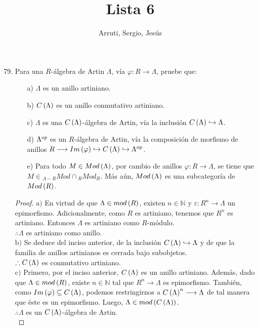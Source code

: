 \documentclass{article}
\title{Lista 6}
\author{Arruti, Sergio, Jesús}
\date{}
\begin{document}
	\maketitle
	\begin{enumerate}[label=\textbf{Ej \arabic*.}]
		\setcounter{enumi}{78}
		\item Para una $R$-álgebra de Artin $\Lambda$, vía $\varphi : R \longrightarrow \Lambda$, pruebe que:
		\begin{itemize}
			\item[a)] $\Lambda$ es un anillo artiniano.
			\item[b)] $C\left(\Lambda\right)$ es un anillo conmutativo artiniano.
			\item[c)] $\Lambda$ es una $C\left(\Lambda\right)$-álgebra de Artin, vía la inclusión $C\left(\Lambda\right)\hookrightarrow\Lambda$.
			\item[d)] ${\Lambda}^{op}$ es un $R$-álgebra de Artin, vía la composición de morfismo de anillos $R \longrightarrow Im\left(\varphi\right)\hookrightarrow C\left(\Lambda\right)\hookrightarrow{\Lambda}^{op}$.
			\item[e)] Para todo $M \in Mod\left(\Lambda\right)$, por cambio de anillos $\varphi : R \longrightarrow \Lambda$, se tiene que $M \in {}_{\Lambda - R}Mod \cap {}_{R}Mod_{R}$. Más aún, $Mod\left(\Lambda\right)$ es una subcategoría de $Mod\left(R\right)$.
		\end{itemize}
		\begin{proof}
			$\boxed{\text{a)}}$ En virtud de que $\Lambda \in mod\left(R\right)$, existen $n\in\mathbb{N}$ y $\varepsilon:R^{n}\longrightarrow\Lambda$ un epimorfismo. Adicionalmente, como $R$ es artiniano, tenemos que $R^{n}$ es artiniano. Entonces $\Lambda$ es artiniano como $R$-módulo.\\
			$\therefore\Lambda$ es artiniano como anillo.\\
			
			$\boxed{\text{b)}}$ Se deduce del inciso anterior, de la inclusión $C\left(\Lambda\right)\hookrightarrow\Lambda$ y de que la familia de anillos artinianos es cerrada bajo subobjetos.\\
			$\therefore C\left(\Lambda\right)$ es conmutativo artiniano.\\
			
			$\boxed{\text{c)}}$ Primero, por el inciso anterior, $C\left(\Lambda\right)$ es un anillo artiniano. Además, dado que $\Lambda \in mod\left(R\right)$, existe $n\in\mathbb{N}$ tal que $R^{n}\longrightarrow\Lambda$ es epimorfismo. También, como $Im\left(\varphi\right)\subseteq C\left(\Lambda\right)$, podemos restringirnos a $C\left(\Lambda\right)^{n}\longrightarrow\Lambda$ de tal manera que éste es un epimorfismo. Luego, $\Lambda \in mod\left(C\left(\Lambda\right)\right)$.\\
			$\therefore\Lambda$ es un $C\left(\Lambda\right)$-álgebra de Artin.\\
			

\end{proof}
\end{enumerate}
\end{document}
